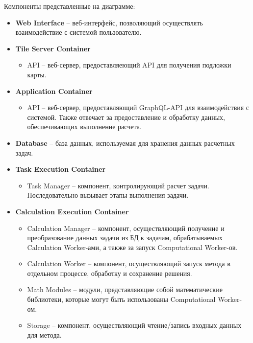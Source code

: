 \noindent Компоненты представленные на диаграмме:
\begin{itemize}
	\item \textbf{Web Interface} -- веб-интерфейс, позволяющий осуществлять взаимодействие с системой пользователю.
	\item \textbf{Tile Server Container}
	\begin{itemize}
		\item API -- веб-сервер, предоставляеющий API для получения подложки карты.
	\end{itemize}
	\item \textbf{Application Container}
	\begin{itemize}
		\item API -- веб-сервер, предоставляющий GraphQL-API для взаимодействия с системой.
		Также отвечает за предоставление и обработку данных, обеспечивающих выполнение расчета.
	\end{itemize}
	\item \textbf{Database} -- база данных, используемая для хранения данных расчетных задач.
	\item {\bf Task Execution Container}
	\begin{itemize}
		\item Task Manager -- компонент, контролирующий расчет задачи. Последовательно вызывает этапы выполнения задачи.
	\end{itemize}
	\item {\bf Calculation Execution Container}
	\begin{itemize}
		\item Calculation Manager -- компонент, осуществляющий получение и преобразование данных задачи из БД к задачам,
		обрабатываемых Calculation Worker-ами, а также за запуск Computational Worker-ов.
		\item Calculation Worker -- компонент, осуществляющий запуск метода в отдельном процессе, обработку и сохранение решения.
		\item Math Modules -- модули, представляющие собой математические библиотеки, которые могут быть использованы Computational Worker-ом.
		\item Storage -- компонент, осуществляющий чтение/запись входных данных для метода.
	\end{itemize}
\end{itemize}


